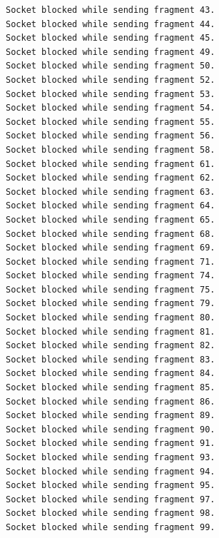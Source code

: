 \begin{lstlisting}[language=bash,basicstyle=\ttfamily\tiny]
Socket blocked while sending fragment 43.
Socket blocked while sending fragment 44.
Socket blocked while sending fragment 45.
Socket blocked while sending fragment 49.
Socket blocked while sending fragment 50.
Socket blocked while sending fragment 52.
Socket blocked while sending fragment 53.
Socket blocked while sending fragment 54.
Socket blocked while sending fragment 55.
Socket blocked while sending fragment 56.
Socket blocked while sending fragment 58.
Socket blocked while sending fragment 61.
Socket blocked while sending fragment 62.
Socket blocked while sending fragment 63.
Socket blocked while sending fragment 64.
Socket blocked while sending fragment 65.
Socket blocked while sending fragment 68.
Socket blocked while sending fragment 69.
Socket blocked while sending fragment 71.
Socket blocked while sending fragment 74.
Socket blocked while sending fragment 75.
Socket blocked while sending fragment 79.
Socket blocked while sending fragment 80.
Socket blocked while sending fragment 81.
Socket blocked while sending fragment 82.
Socket blocked while sending fragment 83.
Socket blocked while sending fragment 84.
Socket blocked while sending fragment 85.
Socket blocked while sending fragment 86.
Socket blocked while sending fragment 89.
Socket blocked while sending fragment 90.
Socket blocked while sending fragment 91.
Socket blocked while sending fragment 93.
Socket blocked while sending fragment 94.
Socket blocked while sending fragment 95.
Socket blocked while sending fragment 97.
Socket blocked while sending fragment 98.
Socket blocked while sending fragment 99.


\end{lstlisting}

